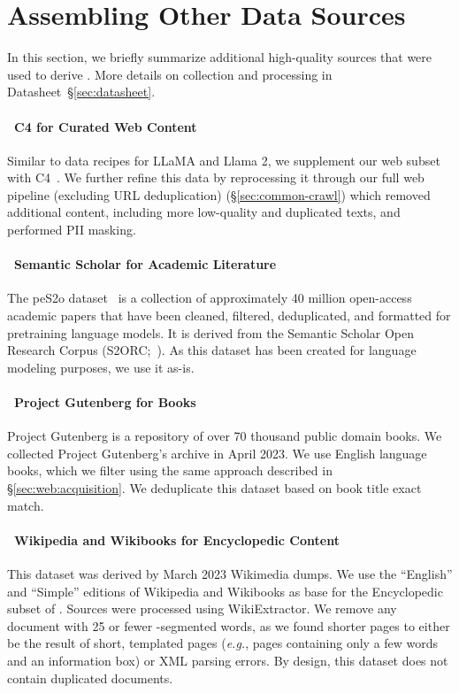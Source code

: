 \section{Assembling Other Data Sources}
\label{sec:other-data-sources}

In this section, we briefly summarize additional high-quality sources that were used to derive \dolma. 
More details on collection and processing in Datasheet~\S\ref{sec:datasheet}.

\paragraph{\dolmaWeb~C4 for Curated Web Content}

Similar to data recipes for LLaMA and Llama 2,  we supplement our web subset with C4~\citep{raffel2020exploring}.
We further refine this data by reprocessing it through our full web pipeline (excluding URL deduplication) (\S\ref{sec:common-crawl}) which removed additional content, including more low-quality and duplicated texts, and performed PII masking.



\paragraph{\dolmaPapers~Semantic Scholar for Academic Literature} 

The peS2o dataset~\citep{peS2o} is a collection of approximately 40 million open-access academic papers that have been cleaned, filtered, deduplicated, and formatted for pretraining language models. 
It is derived from the Semantic Scholar Open Research Corpus (S2ORC;~\citealp{lo-etal-2020-s2orc}).
As this dataset has been created for language modeling purposes, we use it as-is. 

\paragraph{\dolmaBooks~Project Gutenberg for Books} 
Project Gutenberg is a repository of over 70 thousand public domain books. 
We collected Project Gutenberg's archive in April 2023. 
We use English language books, which we filter using the same approach described in \S\ref{sec:web:acquisition}.
We deduplicate this dataset based on book title exact match. 


\paragraph{\dolmaRefs~Wikipedia and Wikibooks for Encyclopedic Content} 

This dataset was derived by March 2023 Wikimedia dumps. 
We use the ``English'' and ``Simple'' editions of Wikipedia and Wikibooks as base for the Encyclopedic subset of \dolma. 
Sources were processed using WikiExtractor\citep{wikiextractor2023}.
We remove any document with 25 or fewer \utf-segmented words, as we found shorter pages to either be the result of short, templated pages (\textit{e.g.}, pages containing only a few words and an information box) or XML parsing errors.
By design, this dataset does not contain duplicated documents.
